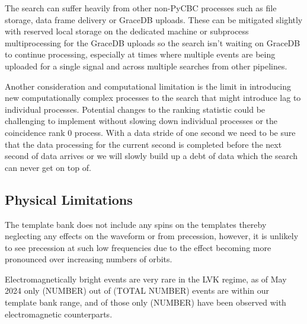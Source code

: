 The search can suffer heavily from other non-PyCBC processes such as file storage, data frame delivery or GraceDB uploads. These can be mitigated slightly with reserved local storage on the dedicated machine or subprocess multiprocessing for the GraceDB uploads so the search isn't waiting on GraceDB to continue processing, especially at times where multiple events are being uploaded for a single signal and across multiple searches from other pipelines.

Another consideration and computational limitation is the limit in introducing new computationally complex processes to the search that might introduce lag to individual processes. Potential changes to the ranking statistic could be challenging to implement without slowing down individual processes or the coincidence rank 0 process. With a data stride of one second we need to be sure that the data processing for the current second is completed before the next second of data arrives or we will slowly build up a debt of data which the search can never get on top of.

\subsection{Physical Limitations}

The template bank does not include any spins on the templates thereby neglecting any effects on the waveform or from precession, however, it is unlikely to see precession at such low frequencies due to the effect becoming more pronounced over increasing numbers of orbits.

Electromagnetically bright events are very rare in the LVK regime, as of May 2024 only (NUMBER) out of (TOTAL NUMBER) events are within our template bank range, and of those only (NUMBER) have been observed with electromagnetic counterparts.


